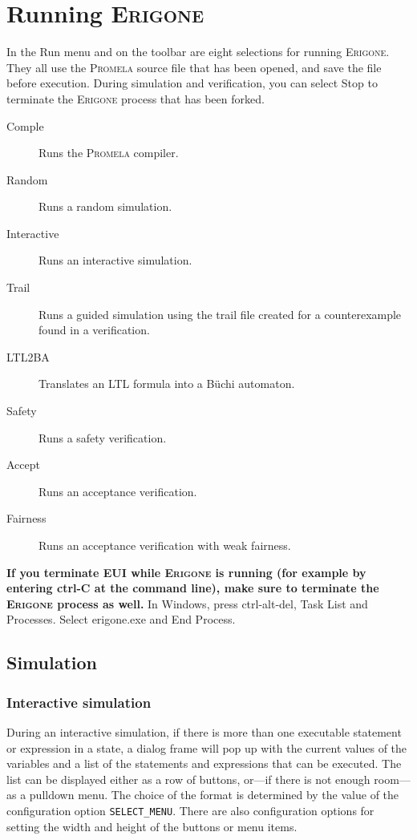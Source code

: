 \documentclass[11pt]{article}
\newcommand{\eri}{\textsc{Erigone}}
\newcommand{\prm}{\textsc{Promela}}
\newcommand{\eui}{\textsc{EUI}}
\newcommand{\p}[1]{\texttt{#1}}
\newcommand{\bu}[1]{\textsf{#1}}
\begin{document}
\section{Running \eri{}}\label{s.run}
In the \bu{Run} menu and on the toolbar are eight selections for
running \eri{}. They all use the \prm{} source file that has been opened,
and save the file before execution.
During simulation and verification,
you can select \bu{Stop} to terminate the \eri{} process that has been forked.
\begin{description}
\item[\bu{Comple}] Runs the \prm{} compiler.
\item[\bu{Random}] Runs a random simulation.
\item[\bu{Interactive}] Runs an interactive simulation.
\item[\bu{Trail}] Runs a guided simulation using the trail
file created for a counterexample found in a verification.
\item[\bu{LTL2BA}] Translates an LTL formula into a B\"{u}chi automaton.
\item[\bu{Safety}] Runs a safety verification.
\item[\bu{Accept}] Runs an acceptance verification.
\item[\bu{Fairness}] Runs an acceptance verification with weak fairness.
\end{description}

\textbf{If you terminate \eui{} while \eri{} is running (for example by
entering \bu{ctrl-C} at the command line), make sure to terminate the
\eri{} process as well.} In Windows, press \bu{ctrl-alt-del}, \bu{Task
List} and \bu{Processes}. Select \bu{erigone.exe} and \bu{End Process}.

\subsection{Simulation}\label{s.sim}

\subsubsection{Interactive simulation}

During an interactive simulation, if there is more than one executable
statement or expression in a state, a dialog frame will pop up with the
current values of the variables and a list of the statements and
expressions that can be executed. The list can be displayed either as a
row of buttons, or---if there is not enough room---as a pulldown menu.
The choice of the format is determined by the value of the configuration
option \p{SELECT\_MENU}. There are also configuration options for
setting the width and height of the buttons or menu items.
\end{document}
